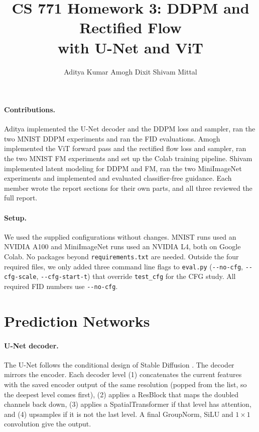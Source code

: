\documentclass[11pt]{article}
\title{CS 771 Homework 3: DDPM and Rectified Flow \\ with U-Net and ViT}
\author{Aditya Kumar \quad Amogh Dixit \quad Shivam Mittal}
\date{}
\begin{document}
\maketitle
\vspace{-2em}

\paragraph{Contributions.} 
Aditya implemented the U-Net decoder and the DDPM loss and sampler, ran the two MNIST DDPM experiments and ran the FID evaluations.
Amogh implemented the ViT forward pass and the rectified flow loss and sampler, ran the two MNIST FM experiments and set up the Colab training pipeline.
Shivam implemented latent modeling for DDPM and FM, ran the two MiniImageNet experiments and implemented and evaluated classifier-free guidance.
Each member wrote the report sections for their own parts, and all three reviewed the full report.

\paragraph{Setup.} We used the supplied configurations without changes. MNIST runs used an NVIDIA A100 and MiniImageNet runs used an NVIDIA L4, both on Google Colab. No packages beyond \texttt{requirements.txt} are needed. Outside the four required files, we only added three command line flags to \texttt{eval.py} (\texttt{-{}-no-cfg}, \texttt{-{}-cfg-scale}, \texttt{-{}-cfg-start-t}) that override \texttt{test\_cfg} for the CFG study. All required FID numbers use \texttt{-{}-no-cfg}.

\section{Prediction Networks}

\paragraph{U-Net decoder.} The U-Net \cite{ronneberger2015unet} follows the conditional design of Stable Diffusion \cite{rombach2022ldm}. The decoder mirrors the encoder. Each decoder level (1) concatenates the current features with the saved encoder output of the same resolution (popped from the list, so the deepest level comes first), (2) applies a ResBlock that maps the doubled channels back down, (3) applies a SpatialTransformer if that level has attention, and (4) upsamples if it is not the last level. A final GroupNorm, SiLU and $1\times1$ convolution give the output.
\end{document}
